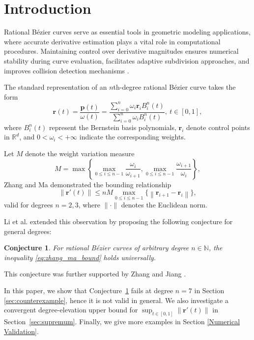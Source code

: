 \documentclass[preprint,12pt]{elsarticle}
\newcommand{\norm}[1]{\left\lVert #1 \right\rVert}
\newtheorem{Conjecture}{Conjecture}
\begin{document}
\section{Introduction}
\label{sec1}

Rational Bézier curves serve as essential tools in geometric modeling applications, where accurate derivative estimation plays a vital role in computational procedures. Maintaining control over derivative magnitudes ensures numerical stability during curve evaluation, facilitates adaptive subdivision approaches, and improves collision detection mechanisms \cite{Farin2002,Sederberg1987,Floater1992,Wang1995}.

The standard representation of an $n$th-degree rational Bézier curve takes the form \cite{Farin2002}
\begin{equation}\label{eq:rational_bezier}
  \mathbf{r}\left( t \right) = \frac{\mathbf{p}(t)}{\omega(t)} = \frac{\sum\limits_{i=0}^n{\omega _i\mathbf{r}_iB_{i}^{n}\left( t \right)}}{\sum\limits_{i=0}^n{\omega _iB_{i}^{n}\left( t \right)}},\ t\in \left[0,1\right],
\end{equation}
where $B_i^n(t)$ represent the Bernstein basis polynomials, $\mathbf{r}_i$ denote control points in $\mathbb{R}^d$, and $0 <\omega_i < +\infty$ indicate the corresponding weights.

Let $M$ denote the weight variation measure
\begin{equation}\label{eq:weight_parameter}
  M = \max \left\{ \max_{0 \le i \le n-1} \frac{\omega_i}{\omega_{i+1}}, \max_{0 \le i \le n-1} \frac{\omega_{i+1}}{\omega_i} \right\},
\end{equation}
Zhang and Ma demonstrated \cite{Zhang2006} the bounding relationship
\begin{equation} \label{eq:zhang_ma_bound}
\norm{\mathbf{r}'(t)} \leqslant nM \max_{0 \le i \le n-1} \{\norm{\mathbf{r}_{i+1} - \mathbf{r}_i}\},
\end{equation}
valid for degrees $n=2,3$, where $\|\cdot\|$ denotes the Euclidean norm.

Li et al. \cite{Li2013} extended this observation by proposing the following conjecture for general degrees:
\begin{Conjecture}\label{conj:Li}
For rational Bézier curves of arbitrary degree $n \in \mathbb{N}$, the inequality \eqref{eq:zhang_ma_bound} holds universally.
\end{Conjecture}
This conjecture was further supported by Zhang and Jiang \cite{Zhang2016}. 

In this paper, we show that Conjecture~\ref{conj:Li} fails at degree $n=7$  in Section \ref{sec:counterexample}, hence it is not valid in general.  We also investigate a convergent degree-elevation upper bound for
\(\sup_{t\in[0,1]}\norm{\mathbf{r}'(t)}\) in Section~\ref{sec:supremum}. Finally, we give more examples in Section \ref{Numerical Validation}.
\end{document}
